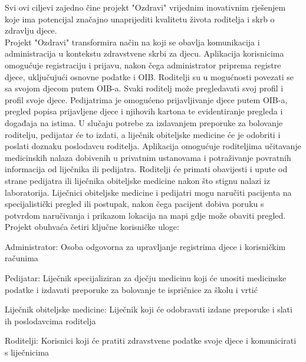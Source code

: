 Svi ovi ciljevi zajedno čine projekt "Ozdravi" vrijednim inovativnim rješenjem koje ima potencijal značajno unaprijediti kvalitetu života roditelja i skrb o zdravlju djece. \\

Projekt "Ozdravi" transformira način na koji se obavlja komunikacija i administracija u kontekstu zdravstvene skrbi za djecu. Aplikacija korisnicima omogućuje registraciju i prijavu, nakon čega administrator priprema registre djece, uključujući osnovne podatke i OIB. Roditelji su u mogućnosti povezati se sa svojom djecom putem OIB-a. Svaki roditelj može pregledavati svoj profil i profil svoje djece. Pedijatrima je omogućeno prijavljivanje djece putem OIB-a, pregled popisa prijavljene djece i njihovih kartona te evidentiranje pregleda i događaja na istima. U slučaju potrebe za izdavanjem preporuke za bolovanje roditelju, pedijatar će to izdati, a liječnik obiteljske medicine će je odobriti i poslati doznaku poslodavcu roditelja. Aplikacija omogućuje roditeljima učitavanje medicinskih nalaza dobivenih u privatnim ustanovama i potraživanje povratnih informacija od liječnika ili pedijatra. Roditelji će primati obavijesti i upute od strane pedijatra ili liječnika obiteljske medicine nakon što stignu nalazi iz laboratorija. Liječnici obiteljske medicine i pedijatri mogu naručiti pacijenta na specijalistički pregled ili postupak, nakon čega pacijent dobiva poruku s potvrdom naručivanja i prikazom lokacija na mapi gdje može obaviti pregled.
\\

Projekt obuhvaća četiri ključne korisničke uloge:
\begin{packed_enum}
    \item Administrator: Osoba odgovorna za upravljanje registrima djece i korisničkim računima
    \item Pedijatar: Liječnik specijaliziran za dječju medicinu koji će unositi medicinske podatke i izdavati preporuke za bolovanje te ispričnice za školu i vrtić
    \item Liječnik obiteljske medicine: Liječnik koji će odobravati izdane preporuke i slati ih poslodavcima roditelja
    \item Roditelji: Korisnici koji će pratiti zdravstvene podatke svoje djece i komunicirati s liječnicima
\end{packed_enum}


